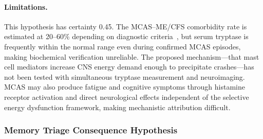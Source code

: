 \begin{hypothesis}
\paragraph{Limitations.}
This hypothesis has certainty 0.45. The MCAS--ME/CFS comorbidity rate is estimated at 20--60\% depending on diagnostic criteria~\cite{Frioni2025MCAS}, but serum tryptase is frequently within the normal range even during confirmed MCAS episodes, making biochemical verification unreliable. The proposed mechanism---that mast cell mediators increase CNS energy demand enough to precipitate crashes---has not been tested with simultaneous tryptase measurement and neuroimaging. MCAS may also produce fatigue and cognitive symptoms through histamine receptor activation and direct neurological effects independent of the selective energy dysfunction framework, making mechanistic attribution difficult.
\end{hypothesis}

\subsubsection{Memory Triage Consequence Hypothesis}

